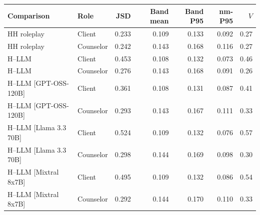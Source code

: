 \begin{tabular}{llrrrrr}
\toprule
Comparison & Role & JSD & Band mean & Band P95 & nm-P95 & $V$ \\
\midrule
HH roleplay & Client & 0.233 & 0.109 & 0.133 & 0.092 & 0.27 \\
HH roleplay & Counselor & 0.242 & 0.143 & 0.168 & 0.116 & 0.27 \\
H--LLM & Client & 0.453 & 0.108 & 0.132 & 0.073 & 0.46 \\
H--LLM & Counselor & 0.276 & 0.143 & 0.168 & 0.091 & 0.26 \\
H--LLM [GPT-OSS-120B] & Client & 0.361 & 0.108 & 0.131 & 0.087 & 0.41 \\
H--LLM [GPT-OSS-120B] & Counselor & 0.293 & 0.143 & 0.167 & 0.111 & 0.33 \\
H--LLM [Llama 3.3 70B] & Client & 0.524 & 0.109 & 0.132 & 0.076 & 0.57 \\
H--LLM [Llama 3.3 70B] & Counselor & 0.298 & 0.144 & 0.169 & 0.098 & 0.30 \\
H--LLM [Mixtral 8x7B] & Client & 0.495 & 0.109 & 0.132 & 0.086 & 0.54 \\
H--LLM [Mixtral 8x7B] & Counselor & 0.292 & 0.144 & 0.170 & 0.110 & 0.33 \\
\bottomrule
\end{tabular}
